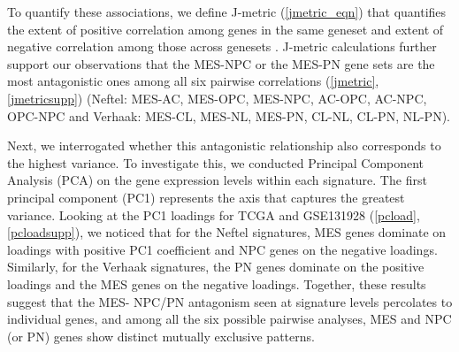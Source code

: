 \documentclass[11pt,a4paper]{article}
\begin{document}
To quantify these associations, we define J-metric (\autoref{jmetric_eqn}) that quantifies the extent of positive correlation among genes in the same geneset and extent of negative correlation among those across genesets \parencite{topojmetric}. J-metric calculations further support our observations that the MES-NPC or the MES-PN gene sets are the most antagonistic ones among all six pairwise correlations (\autoref{jmetric},\autoref{jmetricsupp}) (Neftel: MES-AC, MES-OPC, MES-NPC, AC-OPC, AC-NPC, OPC-NPC and Verhaak: MES-CL, MES-NL, MES-PN, CL-NL, CL-PN, NL-PN).

Next, we interrogated whether this antagonistic relationship also corresponds to the highest variance. To investigate this, we conducted Principal Component Analysis (PCA) on the gene expression levels within each signature. The first principal component (PC1) represents the axis that captures the greatest variance. Looking at the PC1 loadings for TCGA and GSE131928 (\autoref{pcload}, \autoref{pcloadsupp}), we noticed that for the Neftel signatures, MES genes dominate on loadings with positive PC1 coefficient and NPC genes on the negative loadings. Similarly, for the Verhaak signatures, the PN genes dominate on the positive loadings and the MES genes on the negative loadings. Together, these results suggest that the MES- NPC/PN antagonism seen at signature levels percolates to individual genes, and among all the six possible pairwise analyses, MES and NPC (or PN) genes show distinct mutually exclusive patterns.
\end{document}
